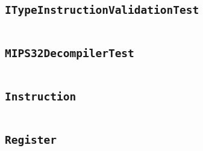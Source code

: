     \begin{landscape}
    \section{\texttt{ITypeInstructionValidationTest}}\label{code:ITypeInstructionValidationTest}
    \begin{multicols}{2} %
    \inputminted[mathescape,
        linenos,
        numbersep=5pt,
        frame=none,
        framesep=2mm,
        fontsize=\footnotesize]{java}{../src/main/test/java/se/filipallberg/dark/mips32decompiler/instruction/ITypeInstructionValidationTest.java}
    \end{multicols}
    \end{landscape}
    


    \begin{landscape}
    \section{\texttt{MIPS32DecompilerTest}}\label{code:MIPS32DecompilerTest}
    \begin{multicols}{2} %
    \inputminted[mathescape,
        linenos,
        numbersep=5pt,
        frame=none,
        framesep=2mm,
        fontsize=\footnotesize]{java}{../src/main/test/java/se/filipallberg/dark/mips32decompiler/instruction/MIPS32DecompilerTest.java}
    \end{multicols}
    \end{landscape}
    


    \begin{landscape}
    \section{\texttt{Instruction}}\label{code:Instruction}
    \begin{multicols}{2} %
    \inputminted[mathescape,
        linenos,
        numbersep=5pt,
        frame=none,
        framesep=2mm,
        fontsize=\footnotesize]{java}{../src/main/java/se/filipallberg/dark/mips32decompiler/instruction/Instruction.java}
    \end{multicols}
    \end{landscape}
    


    \begin{landscape}
    \section{\texttt{Register}}\label{code:Register}
    \begin{multicols}{2} %
    \inputminted[mathescape,
        linenos,
        numbersep=5pt,
        frame=none,
        framesep=2mm,
        fontsize=\footnotesize]{java}{../src/main/java/se/filipallberg/dark/mips32decompiler/instruction/util/Register.java}
    \end{multicols}
    \end{landscape}
    


